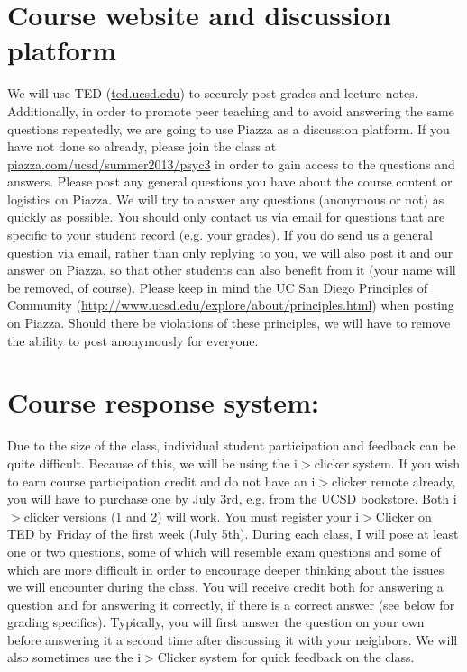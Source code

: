 \documentclass[A4paper,12pt]{article}
\begin{document}
	\section{Course website and discussion platform} We will use TED (\href{http://ted.ucsd.edu}{ted.ucsd.edu}) to securely post grades and lecture notes. Additionally, in order to promote peer teaching and to avoid answering the same questions repeatedly, we are going to use Piazza as a discussion platform. If you have not done so already, please join the class at \mbox{\href{http://piazza.com/ucsd/summer2013/psyc3}{piazza.com/ucsd/summer2013/psyc3}} in order to gain access to the questions and answers. Please post any general questions you have about the course content or logistics on Piazza. We will try to answer any questions (anonymous or not) as quickly as possible. You should only contact us via email for questions that are specific to your student record (e.g. your grades). If you do send us a general question via email, rather than only replying to you, we will also post it and our answer on Piazza, so that other students can also benefit from it (your name will be removed, of course). Please keep in mind the UC San Diego Principles of Community (\href{http://www.ucsd.edu/explore/about/principles.html}{http://www.ucsd.edu/explore/about/principles.html}) when posting on Piazza. Should there be violations of these principles, we will have to remove the ability to post anonymously for everyone.

	\section{Course response system:} Due to the size of the class, individual student participation and feedback can be quite difficult. Because of this, we will be using the i$>$clicker system. If you wish to earn course participation credit and do not have an i$>$clicker remote already, you will have to purchase one by July 3rd, e.g. from the UCSD bookstore. Both i$>$clicker versions (1 and 2) will work. You must register your i$>$Clicker on TED by Friday of the first week (July 5th). During each class, I will pose at least one or two questions, some of which will resemble exam questions and some of which are more difficult in order to encourage deeper thinking about the issues we will encounter during the class. You will receive credit both for answering a question and for answering it correctly, if there is a correct answer (see below for grading specifics). Typically, you will first answer the question on your own before answering it a second time after discussing it with your neighbors. We will also sometimes use the i$>$Clicker system for quick feedback on the class.
\end{document}
